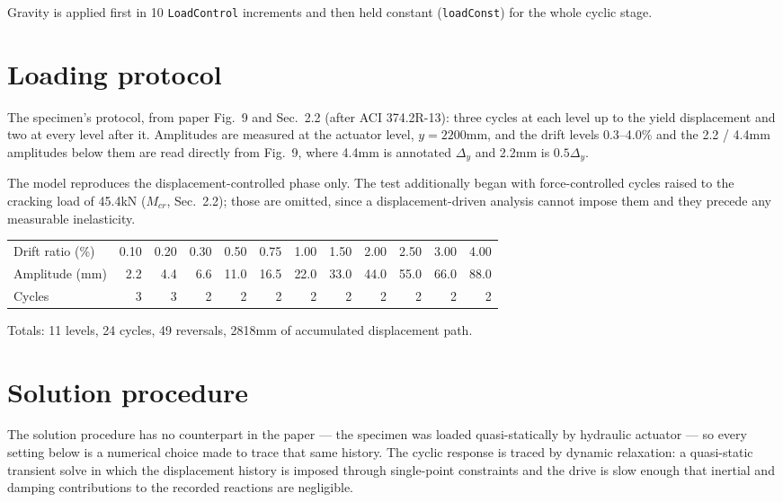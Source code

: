 \documentclass[11pt,a4paper]{article}
\begin{document}
Gravity is applied first in 10 \texttt{LoadControl} increments and then held constant
(\texttt{loadConst}) for the whole cyclic stage.

\section{Loading protocol}

The specimen's protocol, from paper Fig.~9 and Sec.~2.2 (after ACI 374.2R-13): three cycles at each
level up to the yield displacement and two at every level after it. Amplitudes are measured at the
actuator level, $y = 2200$\unit{mm}, and the drift levels 0.3--4.0\% and the 2.2 / 4.4\unit{mm}
amplitudes below them are read directly from Fig.~9, where 4.4\unit{mm} is annotated $\Delta_y$ and
2.2\unit{mm} is $0.5\Delta_y$.

The model reproduces the displacement-controlled phase only. The test additionally began with
force-controlled cycles raised to the cracking load of 45.4\unit{kN} ($M_{cr}$, Sec.~2.2); those are
omitted, since a displacement-driven analysis cannot impose them and they precede any measurable
inelasticity.

\begin{center}\small
\begin{tabular}{@{}lrrrrrrrrrrr@{}}
\toprule
Drift ratio (\%) & 0.10 & 0.20 & 0.30 & 0.50 & 0.75 & 1.00 & 1.50 & 2.00 & 2.50 & 3.00 & 4.00 \\
Amplitude (mm)   & 2.2 & 4.4 & 6.6 & 11.0 & 16.5 & 22.0 & 33.0 & 44.0 & 55.0 & 66.0 & 88.0 \\
Cycles           & 3 & 3 & 2 & 2 & 2 & 2 & 2 & 2 & 2 & 2 & 2 \\
\bottomrule
\end{tabular}\end{center}

Totals: 11 levels, 24 cycles, 49 reversals, 2818\unit{mm} of accumulated displacement path.

\section{Solution procedure}

The solution procedure has no counterpart in the paper --- the specimen was loaded quasi-statically
by hydraulic actuator --- so every setting below is a numerical choice made to trace that same
history. The cyclic response is traced by dynamic relaxation: a quasi-static transient solve in
which the displacement history is imposed through single-point constraints and the drive is slow
enough that inertial and damping contributions to the recorded reactions are negligible.
\end{document}
